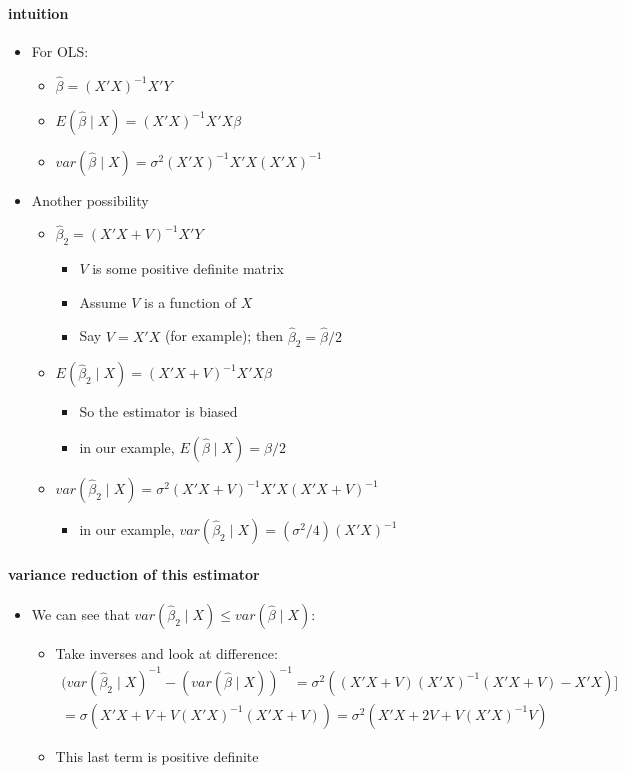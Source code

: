 \paragraph{intuition}
\label{sec-2-3-1}

\begin{itemize}
\item For OLS:
\begin{itemize}
\item $\hat{\beta} = (X'X)^{-1}X'Y$
\item $E(\hat{\beta} \mid X) = (X'X)^{-1}X'X\beta$
\item $var(\hat{\beta} \mid X) = \sigma^{2}(X'X)^{-1} X'X (X'X)^{-1}$
\end{itemize}
\item Another possibility
\begin{itemize}
\item $\hat{\beta}_{2} = (X'X + V)^{-1}X'Y$
\begin{itemize}
\item $V$ is some positive definite matrix
\item Assume $V$ is a function of $X$
\item Say $V = X'X$ (for example); then $\hat{\beta}_{2} =
            \hat{\beta} / 2$
\end{itemize}
\item $E(\hat{\beta}_{2} \mid X) = (X'X + V)^{-1}X'X\beta$
\begin{itemize}
\item So the estimator is biased
\item in our example, $E(\hat{\beta} \mid X) = \beta/2$
\end{itemize}
\item $var(\hat{\beta}_{2} \mid X) = \sigma^{2} (X'X +
          V)^{-1}X'X(X'X + V)^{-1}$
\begin{itemize}
\item in our example, $var(\hat{\beta}_{2} \mid X) = (\sigma^{2}/4) (X'X)^{-1}$
\end{itemize}
\end{itemize}
\end{itemize}
\paragraph{variance reduction of this estimator}
\label{sec-2-3-2}

\begin{itemize}
\item We can see that $var(\hat{\beta}_{2} \mid X) \leq
        var(\hat{\beta} \mid X)$:
\begin{itemize}
\item Take inverses and look at difference:
          \begin{multline*}(var(\hat{\beta}_{2} \mid X)^{-1} -
          (var(\hat{\beta} \mid X))^{-1} = \sigma^{2}((X'X +
          V)(X'X)^{-1}(X'X + V) - X'X) ]\\= \sigma (X'X + V +
          V(X'X)^{-1}(X'X + V)) = \sigma^{2} (X'X + 2 V +
          V(X'X)^{-1}V) 
          \end{multline*}
\item This last term is positive definite
\end{itemize}
\end{itemize}
